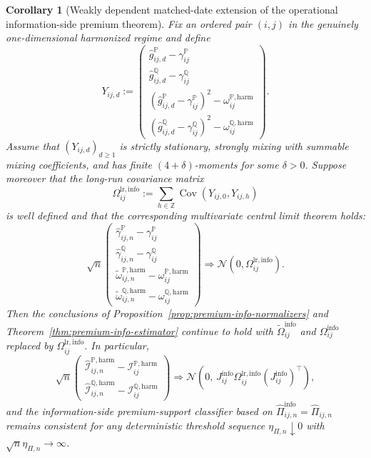 \documentclass[11pt,a4paper]{amsart}
\theoremstyle{plain}
\newtheorem{corollary}[theorem]{Corollary}
\theoremstyle{definition}
\theoremstyle{remark}
\DeclareMathOperator{\Cov}{Cov}
\newcommand{\PP}{\mathbb{P}}
\newcommand{\QQ}{\mathbb{Q}}
\begin{document}
\begin{corollary}[Weakly dependent matched-date extension of the operational information-side premium theorem]\label{cor:premium-info-estimator-mixing}
Fix an ordered pair \((i,j)\) in the genuinely one-dimensional harmonized regime and define
\[
        Y_{ij,d}
        :=
        \begin{pmatrix}
                \widehat g_{ij,d}^\PP-\gamma_{ij}^\PP\\
                \widehat g_{ij,d}^\QQ-\gamma_{ij}^\QQ\\
                (\widehat g_{ij,d}^\PP-\gamma_{ij}^\PP)^2-\omega_{ij}^{\PP,\mathrm{harm}}\\
                (\widehat g_{ij,d}^\QQ-\gamma_{ij}^\QQ)^2-\omega_{ij}^{\QQ,\mathrm{harm}}
        \end{pmatrix}.
\]
Assume that \((Y_{ij,d})_{d\ge1}\) is strictly stationary, strongly mixing with summable mixing
coefficients, and has finite \((4+\delta)\)-moments for some \(\delta>0\).  Suppose moreover that
the long-run covariance matrix
\[
        \Omega_{ij}^{\mathrm{lr,info}}
        :=
        \sum_{h\in\mathbb Z}\Cov(Y_{ij,0},Y_{ij,h})
\]
is well defined and that the corresponding multivariate central limit theorem holds:
\[
        \sqrt{n}
        \begin{pmatrix}
                \widehat\gamma_{ij,n}^\PP-\gamma_{ij}^\PP\\
                \widehat\gamma_{ij,n}^\QQ-\gamma_{ij}^\QQ\\
                \widetilde\omega_{ij,n}^{\PP,\mathrm{harm}}-\omega_{ij}^{\PP,\mathrm{harm}}\\
                \widetilde\omega_{ij,n}^{\QQ,\mathrm{harm}}-\omega_{ij}^{\QQ,\mathrm{harm}}
        \end{pmatrix}
        \Rightarrow
        \mathcal N(0,\Omega_{ij}^{\mathrm{lr,info}}).
\]
Then the conclusions of Proposition~\ref{prop:premium-info-normalizers} and
Theorem~\ref{thm:premium-info-estimator} continue to hold with
\(\widetilde\Omega_{ij}^{\mathrm{info}}\) and \(\Omega_{ij}^{\mathrm{info}}\) replaced by
\(\Omega_{ij}^{\mathrm{lr,info}}\).  In particular,
\[
        \sqrt{n}
        \begin{pmatrix}
                \widehat{\mathcal I}_{ij,n}^{\PP,\mathrm{harm}}-\mathcal I_{ij}^{\PP,\mathrm{harm}}\\
                \widehat{\mathcal I}_{ij,n}^{\QQ,\mathrm{harm}}-\mathcal I_{ij}^{\QQ,\mathrm{harm}}
        \end{pmatrix}
        \Rightarrow
        \mathcal N\!\left(
                0,\,
                J_{ij}^{\mathrm{info}}
                \Omega_{ij}^{\mathrm{lr,info}}
                (J_{ij}^{\mathrm{info}})^\top
        \right),
\]
and the information-side premium-support classifier based on
\(\widehat\Pi_{ij,n}^{\mathrm{info}}=\widehat\Pi_{ij,n}\) remains consistent for any deterministic
threshold sequence \(\eta_{\Pi,n}\downarrow0\) with \(\sqrt{n}\eta_{\Pi,n}\to\infty\).
\end{corollary}
\end{document}
